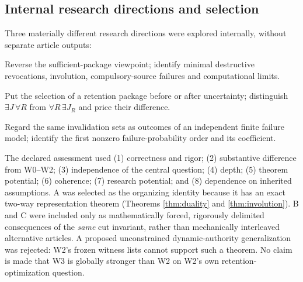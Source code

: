 \documentclass[11pt,letterpaper]{article}
\begin{document}
\subsection{Internal research directions and selection}
Three materially different research directions were explored internally, without separate article outputs:
\begin{description}[style=nextline,leftmargin=2.2cm]
\item[A -- Fault cuts.] Reverse the sufficient-package viewpoint; identify minimal destructive revocations, involution, compulsory-source failures and computational limits.
\item[B -- Temporal choice.] Put the selection of a retention package before or after uncertainty; distinguish $\exists J\,\forall R$ from $\forall R\,\exists J_R$ and price their difference.
\item[C -- Rare faults.] Regard the same invalidation sets as outcomes of an independent finite failure model; identify the first nonzero failure-probability order and its coefficient.
\end{description}
The declared assessment used (1) correctness and rigor; (2) substantive difference from W0--W2; (3) independence of the central question; (4) depth; (5) theorem potential; (6) coherence; (7) research potential; and (8) dependence on inherited assumptions. A was selected as the organizing identity because it has an exact two-way representation theorem (Theorems \ref{thm:duality} and \ref{thm:involution}). B and C were included only as mathematically forced, rigorously delimited consequences of the \emph{same} cut invariant, rather than mechanically interleaved alternative articles. A proposed unconstrained dynamic-authority generalization was rejected: W2's frozen witness lists cannot support such a theorem. No claim is made that W3 is globally stronger than W2 on W2's own retention-optimization question.
\end{document}
